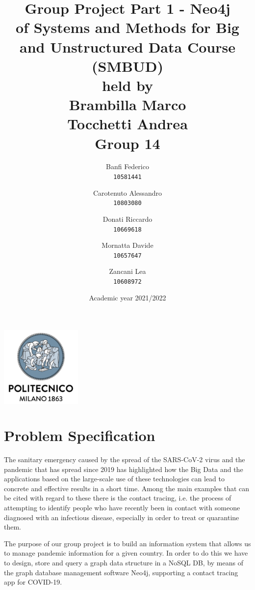 \documentclass[a4paper,12pt]{article}
\begin{document}
\title{%
  Group Project Part 1 - Neo4j \\
  \large of Systems and Methods for Big
    and Unstructured Data Course \\(SMBUD)\\
    held by\\ Brambilla Marco\\ Tocchetti Andrea \\
  \vspace{5mm}
  \Large \textbf{Group 14}}
\author{Banfi Federico\\
  \texttt{10581441}
  \and
  Carotenuto Alessandro\\
  \texttt{10803080}
  \and
  Donati Riccardo\\
  \texttt{10669618}
  \and
  Mornatta Davide\\
  \texttt{10657647}
  \and
  Zancani Lea\\
  \texttt{10608972}}
\date{Academic year 2021/2022}
\maketitle
\begin{center}
  \includegraphics[width=4cm]{polilogo.png}\\
\end{center}
\newpage
\tableofcontents
\newpage
\section{Problem Specification}
\paragraph{}The sanitary emergency caused by the spread of the SARS-CoV-2 virus and the pandemic that has spread since 2019 has highlighted how the Big Data and the applications based on the large-scale use of these technologies can lead to concrete and effective results in a short time. Among the main examples that can be cited with regard to these there is the contact tracing, i.e. the process of attempting to identify people who have recently been in contact with someone diagnosed with an infectious disease, especially in order to treat or quarantine them. \par
The purpose of our group project is to build an information system that allows us to manage pandemic information for a given country. In order to do this we have to design, store and query a graph data structure in a NoSQL DB, by means of the graph database management software Neo4j, supporting a contact tracing app for COVID-19.
\end{document}
